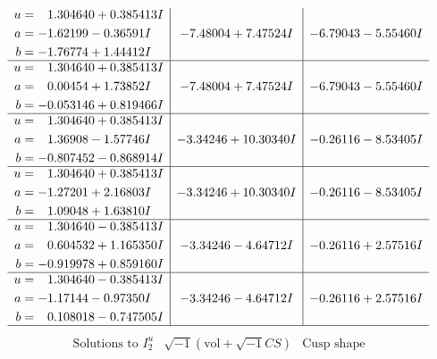 \documentclass[1p]{elsarticle_modified}
\theoremstyle{definition}
\newcommand{\I}{\sqrt{-1}}
\begin{document}
$$\begin{array}{c|c|c}
\begin{aligned}
u &= \phantom{-}1.304640 + 0.385413 I \\
a &= -1.62199 - 0.36591 I \\
b &= -1.76774 + 1.44412 I\end{aligned}
 & -7.48004 + 7.47524 I & -6.79043 - 5.55460 I \\ \hline\begin{aligned}
u &= \phantom{-}1.304640 + 0.385413 I \\
a &= \phantom{-}0.00454 + 1.73852 I \\
b &= -0.053146 + 0.819466 I\end{aligned}
 & -7.48004 + 7.47524 I & -6.79043 - 5.55460 I \\ \hline\begin{aligned}
u &= \phantom{-}1.304640 + 0.385413 I \\
a &= \phantom{-}1.36908 - 1.57746 I \\
b &= -0.807452 - 0.868914 I\end{aligned}
 & -3.34246 + 10.30340 I & -0.26116 - 8.53405 I \\ \hline\begin{aligned}
u &= \phantom{-}1.304640 + 0.385413 I \\
a &= -1.27201 + 2.16803 I \\
b &= \phantom{-}1.09048 + 1.63810 I\end{aligned}
 & -3.34246 + 10.30340 I & -0.26116 - 8.53405 I \\ \hline\begin{aligned}
u &= \phantom{-}1.304640 - 0.385413 I \\
a &= \phantom{-}0.604532 + 1.165350 I \\
b &= -0.919978 + 0.859160 I\end{aligned}
 & -3.34246 - 4.64712 I & -0.26116 + 2.57516 I \\ \hline\begin{aligned}
u &= \phantom{-}1.304640 - 0.385413 I \\
a &= -1.17144 - 0.97350 I \\
b &= \phantom{-}0.108018 - 0.747505 I\end{aligned}
 & -3.34246 - 4.64712 I & -0.26116 + 2.57516 I\\
 \hline 
 \end{array}$$\newpage$$\begin{array}{c|c|c}  
\text{Solutions to }I^u_{2}& \I (\text{vol} + \sqrt{-1}CS) & \text{Cusp shape}\\
 \hline 
\begin{aligned}

\end{aligned}
\end{array}$$
\end{document}
